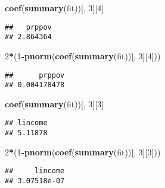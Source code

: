 \documentclass[
]{article}
\newenvironment{Shaded}{\begin{snugshade}}{\end{snugshade}}
\newcommand{\CommentTok}[1]{\textcolor[rgb]{0.56,0.35,0.01}{\textit{#1}}}
\newcommand{\DataTypeTok}[1]{\textcolor[rgb]{0.13,0.29,0.53}{#1}}
\newcommand{\DecValTok}[1]{\textcolor[rgb]{0.00,0.00,0.81}{#1}}
\newcommand{\KeywordTok}[1]{\textcolor[rgb]{0.13,0.29,0.53}{\textbf{#1}}}
\newcommand{\NormalTok}[1]{#1}
\newcommand{\OperatorTok}[1]{\textcolor[rgb]{0.81,0.36,0.00}{\textbf{#1}}}
\newcommand{\StringTok}[1]{\textcolor[rgb]{0.31,0.60,0.02}{#1}}
\begin{document}
\begin{Shaded}
\begin{Highlighting}[]
\KeywordTok{coef}\NormalTok{(}\KeywordTok{summary}\NormalTok{(fit))[, }\DecValTok{3}\NormalTok{][}\DecValTok{4}\NormalTok{]}
\end{Highlighting}
\end{Shaded}

\begin{verbatim}
##   prppov 
## 2.864364
\end{verbatim}

\begin{Shaded}
\begin{Highlighting}[]
\DecValTok{2}\OperatorTok{*}\NormalTok{(}\DecValTok{1}\OperatorTok{-}\KeywordTok{pnorm}\NormalTok{(}\KeywordTok{coef}\NormalTok{(}\KeywordTok{summary}\NormalTok{(fit))[, }\DecValTok{3}\NormalTok{][}\DecValTok{4}\NormalTok{]))}
\end{Highlighting}
\end{Shaded}

\begin{verbatim}
##      prppov 
## 0.004178478
\end{verbatim}

\begin{Shaded}
\begin{Highlighting}[]
\KeywordTok{coef}\NormalTok{(}\KeywordTok{summary}\NormalTok{(fit))[, }\DecValTok{3}\NormalTok{][}\DecValTok{3}\NormalTok{]}
\end{Highlighting}
\end{Shaded}

\begin{verbatim}
## lincome 
## 5.11878
\end{verbatim}

\begin{Shaded}
\begin{Highlighting}[]
\DecValTok{2}\OperatorTok{*}\NormalTok{(}\DecValTok{1}\OperatorTok{-}\KeywordTok{pnorm}\NormalTok{(}\KeywordTok{coef}\NormalTok{(}\KeywordTok{summary}\NormalTok{(fit))[, }\DecValTok{3}\NormalTok{][}\DecValTok{3}\NormalTok{]))}
\end{Highlighting}
\end{Shaded}

\begin{verbatim}
##     lincome 
## 3.07518e-07
\end{verbatim}

\begin{Shaded}
\end{Shaded}
\end{document}
